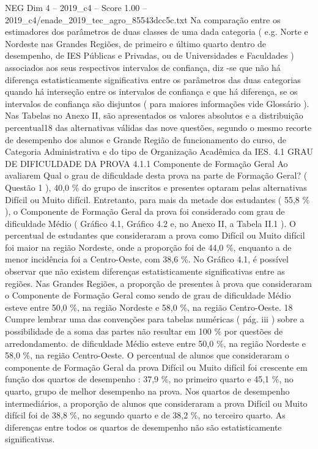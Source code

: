 \begin{textsample}{NEG Dim 4 – 2019\_c4 – Score 1.00 – 2019\_c4/enade\_2019\_tec\_agro\_85543dcc5c.txt}
Na comparação entre os estimadores dos parâmetros de duas classes de uma dada categoria ( e.g.
Norte e Nordeste nas Grandes Regiões, de primeiro e último quarto dentro de desempenho, de IES Públicas e Privadas, ou de Universidades e Faculdades ) associados aos seus respectivos intervalos de confiança, diz -se que não há diferença estatisticamente significativa entre os parâmetros das duas categorias quando há interseção entre os intervalos de confiança e que há diferença, se os intervalos de confiança são disjuntos ( para maiores informações vide Glossário ).
Nas Tabelas no Anexo II, são apresentados os valores absolutos e a distribuição percentual18 das alternativas válidas das nove questões, segundo o mesmo recorte de desempenho dos alunos e Grande Região de funcionamento do curso, de Categoria Administrativa e do tipo de Organização Acadêmica da IES. 4.1 GRAU DE DIFICULDADE DA PROVA 4.1.1 Componente de Formação Geral Ao avaliarem Qual o grau de dificuldade desta prova na parte de Formação Geral? ( Questão 1 ), 40,0 \% do grupo de inscritos e presentes optaram pelas alternativas Difícil ou Muito difícil.
Entretanto, para mais da metade dos estudantes ( 55,8 \% ), o Componente de Formação Geral da prova foi considerado com grau de dificuldade Médio ( Gráfico 4.1, Gráfico 4.2 e, no Anexo II, a Tabela II.1 ).
O percentual de estudantes que consideraram a prova como Difícil ou Muito difícil foi maior na região Nordeste, onde a proporção foi de 44,0 \%, enquanto a de menor incidência foi a Centro-Oeste, com 38,6 \%.
No Gráfico 4.1, é possível observar que não existem diferenças estatisticamente significativas entre as regiões.
Nas Grandes Regiões, a proporção de presentes à prova que consideraram o Componente de Formação Geral como sendo de grau de dificuldade Médio esteve entre 50,0 \%, na região Nordeste e 58,0 \%, na região Centro-Oeste. 18 Cumpre lembrar uma das convenções para tabelas numéricas ( pág. iii ) sobre a possibilidade de a soma das partes não resultar em 100 \% por questões de arredondamento. de dificuldade Médio esteve entre 50,0 \%, na região Nordeste e 58,0 \%, na região Centro-Oeste.
O percentual de alunos que consideraram o componente de Formação Geral da prova Difícil ou Muito difícil foi crescente em função dos quartos de desempenho : 37,9 \%, no primeiro quarto e 45,1 \%, no quarto, grupo de melhor desempenho na prova.
Nos quartos de desempenho intermediários, a proporção de alunos que consideraram a prova Difícil ou Muito difícil foi de 38,8 \%, no segundo quarto e de 38,2 \%, no terceiro quarto.
As diferenças entre todos os quartos de desempenho não são estatisticamente significativas.

\end{textsample}
